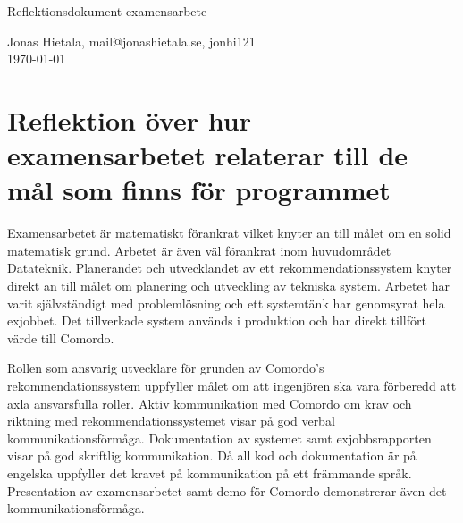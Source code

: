 \documentclass[11pt]{article}
\begin{document}
\begin{center}



{ \LARGE Reflektionsdokument examensarbete \\[0.4cm] }

Jonas Hietala, mail@jonashietala.se, jonhi121 \\[0.2cm]

\today

\end{center}


\section*{Reflektion över hur examensarbetet relaterar till de mål som finns för programmet}



Examensarbetet är matematiskt förankrat vilket knyter an till målet om en solid matematisk grund. Arbetet är även väl förankrat inom huvudområdet Datateknik. Planerandet och utvecklandet av ett rekommendationssystem knyter direkt an till målet om planering och utveckling av tekniska system. Arbetet har varit självständigt med problemlösning och ett systemtänk har genomsyrat hela exjobbet. Det tillverkade system används i produktion och har direkt tillfört värde till Comordo.

Rollen som ansvarig utvecklare för grunden av Comordo's rekommendationssystem uppfyller målet om att ingenjören ska vara förberedd att axla ansvarsfulla roller. Aktiv kommunikation med Comordo om krav och riktning med rekommendationssystemet visar på god verbal kommunikationsförmåga. Dokumentation av systemet samt exjobbsrapporten visar på god skriftlig kommunikation. Då all kod och dokumentation är på engelska uppfyller det kravet på kommunikation på ett främmande språk.  Presentation av examensarbetet samt demo för Comordo demonstrerar även det kommunikationsförmåga.
\end{document}

